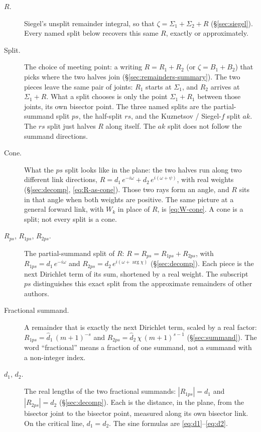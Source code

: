 \documentclass[11pt]{article}
\theoremstyle{definition}
\begin{document}
\begin{description}
\item[$R$.]
Siegel's unsplit remainder integral, so that
$\zeta=\Sigma_1+\Sigma_2+R$ (\S\ref{sec:siegel}).
Every named split below recovers this same $R$, exactly or
approximately.

\item[Split.]
The choice of meeting point: a writing
$R=R_1+R_2$ (or $\zeta=B_1+B_2$) that picks where the two
halves join
(\S\ref{sec:remainders-summary}).
The two pieces leave the same pair of joints: $R_1$ starts at
$\Sigma_1$, and $R_2$ arrives at $\Sigma_1+R$. What a split
chooses is only the point $\Sigma_1+R_1$ between those joints,
its own bisector point. The three named splits are the
partial-summand split $ps$, the half-split $rs$, and the
Kuznetsov / Siegel-$f$ split $ak$. The $rs$ split just halves
$R$ along itself. The $ak$ split does not follow the summand
directions.

\item[Cone.]
What the $ps$ split looks like in the plane: the two halves run
along two different link directions,
$R=d_1\,e^{-i\omega}+d_2\,e^{i(\omega+\psi)}$, with real weights
(\S\ref{sec:decomp}, \eqref{eq:R-as-cone}).
Those two rays form an angle, and $R$ sits in that angle when
both weights are positive. The same picture at a general forward
link, with $W_k$ in place of $R$, is \eqref{eq:W-cone}.
A cone is a split; not every split is a cone.

\item[$R_{ps}$, $R_{1ps}$, $R_{2ps}$.]
The partial-summand split of $R$:
$R=R_{ps}=R_{1ps}+R_{2ps}$, with
$R_{1ps}=d_1\,e^{-i\omega}$ and
$R_{2ps}=d_2\,e^{i(\omega+\arg\chi)}$
(\S\ref{sec:decomp}).
Each piece is the next Dirichlet term of its sum, shortened by a
real weight.
The subscript $ps$ distinguishes this exact split from the
approximate remainders of other authors.

\item[Fractional summand.]
A remainder that is exactly the next Dirichlet term, scaled by a
real factor: $R_{1ps}=\hat d_1\,(m+1)^{-s}$ and
$R_{2ps}=\hat d_2\,\chi\,(m+1)^{s-1}$
(\S\ref{sec:summand}).
The word ``fractional'' means a fraction of one summand, not a
summand with a non-integer index.

\item[$d_1$, $d_2$.]
The real lengths of the two fractional summands:
$|R_{1ps}|=d_1$ and $|R_{2ps}|=d_2$
(\S\ref{sec:decomp}).
Each is the distance, in the plane, from the bisector joint to the
bisector point, measured along its own bisector link.
On the critical line, $d_1=d_2$.
The sine formulas are \eqref{eq:d1}--\eqref{eq:d2}.


\end{description}
\end{document}
